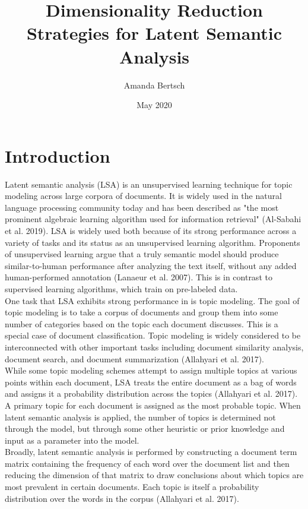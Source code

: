 \documentclass{article}
\title{Dimensionality Reduction Strategies for Latent Semantic Analysis}
\author{Amanda Bertsch}
\date{May 2020}
\begin{document}
\maketitle

\section{Introduction}

Latent semantic analysis (LSA) is an unsupervised learning technique for topic modeling across large corpora of documents. It is widely used in the natural language processing community today and has been described as "the most prominent algebraic learning algorithm used for information retrieval" (Al-Sabahi et al. 2019). LSA is widely used both because of its strong performance across a variety of tasks and its status as an unsupervised learning algorithm. Proponents of unsupervised learning argue that a truly semantic model should produce similar-to-human performance after analyzing the text itself, without any added human-performed annotation (Lanaeur et al. 2007). This is in contrast to supervised learning algorithms, which train on pre-labeled data. \\

One task that LSA exhibits strong performance in is topic modeling. The goal of topic modeling is to take a corpus of documents and group them into some number of categories based on the topic each document discusses. This is a special case of document classification. Topic modeling is widely considered to be interconnected with other important tasks including document similarity analysis, document search, and document summarization (Allahyari et al. 2017). \\

While some topic modeling schemes attempt to assign multiple topics at various points within each document, LSA treats the entire document as a bag of words and assigns it a probability distribution across the topics (Allahyari et al. 2017). A primary topic for each document is assigned as the most probable topic. When latent semantic analysis is applied, the number of topics is determined not through the model, but through some other heuristic or prior knowledge and input as a parameter into the model.\\

Broadly, latent semantic analysis is performed by constructing a document term matrix containing the frequency of each word over the document list and then reducing the dimension of that matrix to draw conclusions about which topics are most prevalent in certain documents. Each topic is itself a probability distribution over the words in the corpus (Allahyari et al. 2017). \\
\end{document}
